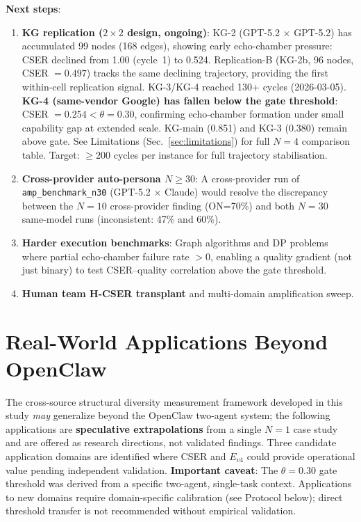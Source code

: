 \documentclass[12pt]{article}
\begin{document}
\noindent\textbf{Next steps}:
\begin{enumerate}
  \item \textbf{KG replication ($2\times2$ design, ongoing)}:
        KG-2 (GPT-5.2 $\times$ GPT-5.2) has accumulated 99 nodes (168 edges),
        showing early echo-chamber pressure: CSER declined from 1.00 (cycle~1)
        to 0.524. Replication-B (KG-2b, 96 nodes, CSER $=0.497$) tracks the same declining trajectory, providing
        the first within-cell replication signal.
        KG-3/KG-4 reached 130+ cycles (2026-03-05).
        \textbf{KG-4 (same-vendor Google) has fallen below the gate threshold}:
        CSER $= 0.254 < \theta = 0.30$, confirming echo-chamber formation
        under small capability gap at extended scale.
        KG-main (0.851) and KG-3 (0.380) remain above gate.
        See Limitations (Sec.~\ref{sec:limitations}) for full $N=4$ comparison table.
        Target: $\geq 200$ cycles per instance for full trajectory stabilisation.
  \item \textbf{Cross-provider auto-persona $N\geq30$}: A cross-provider run of
        \texttt{amp\_benchmark\_n30} (GPT-5.2 $\times$ Claude) would resolve the
        discrepancy between the $N=10$ cross-provider finding (ON=70\%) and both
        $N=30$ same-model runs (inconsistent: 47\% and 60\%).
  \item \textbf{Harder execution benchmarks}: Graph algorithms and DP problems
        where partial echo-chamber failure rate $> 0$, enabling a quality gradient
        (not just binary) to test CSER--quality correlation above the gate threshold.
  \item \textbf{Human team H-CSER transplant} and multi-domain amplification sweep.
\end{enumerate}

\section{Real-World Applications Beyond OpenClaw}
\label{sec:applications}

The cross-source structural diversity measurement framework developed in this study \emph{may} generalize beyond the OpenClaw two-agent system; the following applications are \textbf{speculative extrapolations} from a single $N=1$ case study and are offered as research directions, not validated findings. Three candidate application domains are identified where CSER and $E_{v4}$ could provide operational value pending independent validation. \textbf{Important caveat}: The $\theta = 0.30$ gate threshold was derived from a specific two-agent, single-task context. Applications to new domains require domain-specific calibration (see Protocol below); direct threshold transfer is not recommended without empirical validation.
\end{document}
